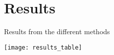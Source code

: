 \section{Results}

\begin{table}[H]
  \centering
  \caption{Results from the different methods}
\label{tab:results}
  \texttt{[image: results\_table]}
\end{table}


